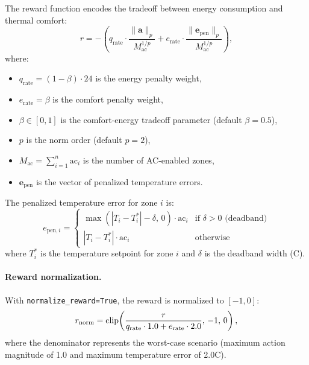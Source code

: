 The reward function encodes the tradeoff between energy consumption and thermal comfort:
\begin{equation}
    r = -\left(q_{\text{rate}} \cdot \frac{\|\mathbf{a}\|_p}{M_{\text{ac}}^{1/p}} + e_{\text{rate}} \cdot \frac{\|\mathbf{e}_{\text{pen}}\|_p}{M_{\text{ac}}^{1/p}}\right),
    \label{eq:building_reward}
\end{equation}
where:
\begin{itemize}
    \item $q_{\text{rate}} = (1 - \beta) \cdot 24$ is the energy penalty weight,
    \item $e_{\text{rate}} = \beta$ is the comfort penalty weight,
    \item $\beta \in [0, 1]$ is the comfort-energy tradeoff parameter (default $\beta = 0.5$),
    \item $p$ is the norm order (default $p = 2$),
    \item $M_{\text{ac}} = \sum_{i=1}^{n} \text{ac}_i$ is the number of AC-enabled zones,
    \item $\mathbf{e}_{\text{pen}}$ is the vector of penalized temperature errors.
\end{itemize}

The penalized temperature error for zone $i$ is:
\begin{equation}
    e_{\text{pen},i} = \begin{cases}
    \max(|T_i - T_i^*| - \delta, \, 0) \cdot \text{ac}_i & \text{if } \delta > 0 \text{ (deadband)} \\
    |T_i - T_i^*| \cdot \text{ac}_i & \text{otherwise}
    \end{cases}
    \label{eq:temp_error}
\end{equation}
where $T_i^*$ is the temperature setpoint for zone $i$ and $\delta$ is the deadband width (\degree C).

\paragraph{Reward normalization.} With \texttt{normalize\_reward=True}, the reward is normalized to $[-1, 0]$:
\begin{equation}
    r_{\text{norm}} = \operatorname{clip}\!\left(\frac{r}{q_{\text{rate}} \cdot 1.0 + e_{\text{rate}} \cdot 2.0}, \, -1, \, 0\right),
    \label{eq:building_reward_norm}
\end{equation}
where the denominator represents the worst-case scenario (maximum action magnitude of 1.0 and maximum temperature error of 2.0\degree C).


